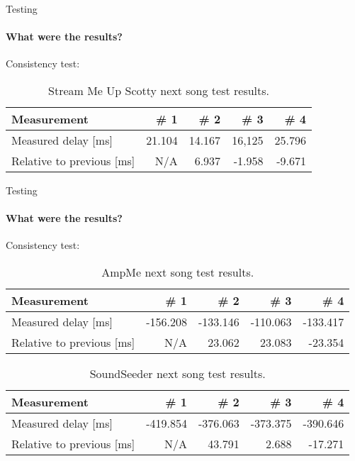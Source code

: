         \begin{frame}{Testing}\framesubtitle{What were the results?}
            Consistency test:\bigskip
            \begin{table}[ht]
                \centering
                \footnotesize
                \begin{tabularx}{0.85\textwidth}{Xrrrr}
                    \toprule
                    Measurement                 & \# 1      & \# 2      & \# 3     & \# 4     \\\midrule
                    Measured delay [ms]         & 21.104    & 14.167    & 16,125   & 25.796   \\
                    Relative to previous [ms]   & N/A       & 6.937     & -1.958   & -9.671   \\\bottomrule
                \end{tabularx}
                \caption{Stream Me Up Scotty next song test results.}\label{fig:smus_pause_resume}
            \end{table}
        \end{frame}
        \begin{frame}{Testing}\framesubtitle{What were the results?}
        Consistency test:\bigskip
            \begin{table}[ht]
                \centering
                \footnotesize
                \begin{tabularx}{0.85\textwidth}{Xrrrr}
                    \toprule
                    Measurement                 & \# 1      & \# 2     & \# 3     & \# 4      \\ \midrule
                    Measured delay [ms]         & -156.208  & -133.146 & -110.063 & -133.417   \\
                    Relative to previous [ms]   & N/A       & 23.062   & 23.083   & -23.354   \\ \bottomrule
                \end{tabularx}
                \caption{AmpMe next song test results.}
                \label{fig:ampmenextsongfigure}
            \end{table}
            \begin{table}[ht]
                \centering
                \footnotesize
                \begin{tabularx}{0.85\textwidth}{Xrrrr}
                    \toprule
                    Measurement                 & \# 1      & \# 2      & \# 3     & \# 4       \\ \midrule
                    Measured delay [ms]         & -419.854  & -376.063  & -373.375 & -390.646 \\
                    Relative to previous [ms]   & N/A       & 43.791    & 2.688  & -17.271  \\ \bottomrule
                \end{tabularx}
                \caption{SoundSeeder next song test results.}
                \label{fig:soundseedernextsongfigure}
            \end{table}
        \end{frame}
